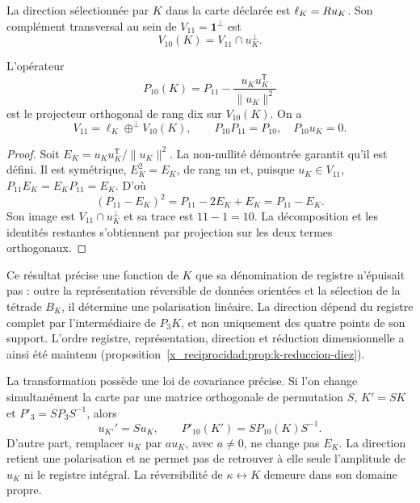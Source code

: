 \begin{definition}
La direction sélectionnée par \(K\) dans la carte déclarée est
\(\ell_K=R u_K\). Son complément transversal au sein de
\(V_{11}=\mathbf1^\perp\) est
\[
 V_{10}(K)=V_{11}\cap u_K^\perp.
\]
\end{definition}

\begin{proposition}
\label{x_reciprocidad:prop:k-reduccion-diez}
L'opérateur
\begin{equation}
 P_{10}(K)=P_{11}
       -\frac{u_Ku_K^{\mathsf T}}{\lVert u_K\rVert^2}
 \label{x_reciprocidad:eq:k-proyector-diez}
\end{equation}
est le projecteur orthogonal de rang dix sur \(V_{10}(K)\). On a
\[
 V_{11}=\ell_K\mathbin{\oplus^{\perp}}V_{10}(K),
 \qquad P_{10}P_{11}=P_{10},\quad P_{10}u_K=0.
\]
\end{proposition}
\begin{proof}
Soit \(E_K=u_Ku_K^{\mathsf T}/\lVert u_K\rVert^2\). La non-nullité démontrée garantit qu'il est défini. Il est symétrique, \(E_K^2=E_K\), de rang un et, puisque \(u_K\in V_{11}\), \(P_{11}E_K=E_KP_{11}=E_K\). D'où
\[
 (P_{11}-E_K)^2=P_{11}-2E_K+E_K=P_{11}-E_K.
\]
Son image est \(V_{11}\cap u_K^\perp\) et sa trace est
\(11-1=10\). La décomposition et les identités restantes
s'obtiennent par projection sur les deux termes orthogonaux.
\end{proof}

Ce résultat précise une fonction de \(K\) que sa dénomination de registre n'épuisait pas : outre la représentation réversible de données orientées et la sélection de la tétrade \(B_K\), il détermine une polarisation linéaire. La direction dépend du registre complet par l'intermédiaire de \(P_3K\), et non uniquement des quatre points de son support. L'ordre registre, représentation, direction et réduction dimensionnelle a ainsi été maintenu (proposition~\ref{x_reciprocidad:prop:k-reduccion-diez}).

La transformation possède une loi de covariance précise. Si l'on change simultanément la carte par une matrice orthogonale de permutation \(S\), \(K'=SK\) et \(P'_3=SP_3S^{-1}\), alors
\[
 u_{K'}'=Su_K,\qquad P'_{10}(K')=SP_{10}(K)S^{-1}.
\]
D'autre part, remplacer \(u_K\) par \(a u_K\), avec \(a\ne0\),
ne change pas \(E_K\). La direction retient une polarisation et ne
permet pas de retrouver à elle seule l'amplitude de \(u_K\) ni le
registre intégral. La réversibilité de \(\kappa\leftrightarrow K\)
demeure dans son domaine propre.

